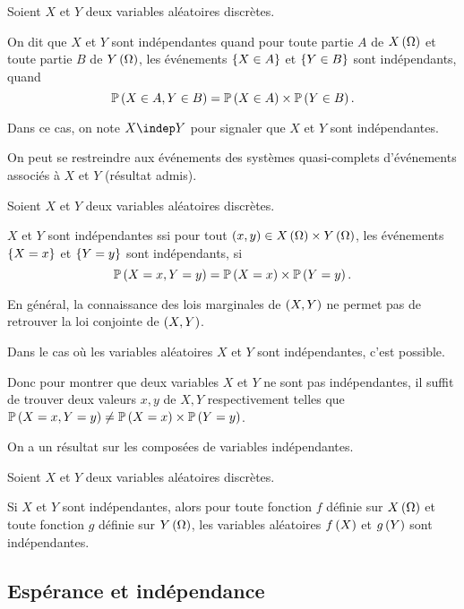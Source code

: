 \begin{defi}
Soient \(X\) et \(Y\) deux variables aléatoires discrètes.

On dit que \(X\) et \(Y\) sont indépendantes quand pour toute partie \(A\) de \(X\left(\Omega\right)\) et toute partie \(B\) de \(Y\left(\Omega\right)\), les événements \(\left\lbrace X\in A\right\rbrace\) et \(\left\lbrace Y\in B\right\rbrace\) sont indépendants, \ie quand \[\mathbb{P}\left(X\in A,Y\in B\right)=\mathbb{P}\left(X\in A\right)\times\mathbb{P}\left(Y\in B\right).\]
\end{defi}

Dans ce cas, on note \(X\indep Y\) pour signaler que \(X\) et \(Y\) sont indépendantes.

On peut se restreindre aux événements des systèmes quasi-complets d'événements associés à \(X\) et \(Y\) (résultat admis).

\begin{prop}
Soient \(X\) et \(Y\) deux variables aléatoires discrètes.

\(X\) et \(Y\) sont indépendantes ssi pour tout \(\left(x,y\right)\in X\left(\Omega\right)\times Y\left(\Omega\right)\), les événements \(\left\lbrace X=x\right\rbrace\) et \(\left\lbrace Y=y\right\rbrace\) sont indépendants, \ie si \[\mathbb{P}\left(X=x,Y=y\right)=\mathbb{P}\left(X=x\right)\times\mathbb{P}\left(Y=y\right).\]
\end{prop}

\begin{rem}
En général, la connaissance des lois marginales de \(\left(X,Y\right)\) ne permet pas de retrouver la loi conjointe de \(\left(X,Y\right)\).

Dans le cas où les variables aléatoires \(X\) et \(Y\) sont indépendantes, c'est possible.

Donc pour montrer que deux variables \(X\) et \(Y\) ne sont pas indépendantes, il suffit de trouver deux valeurs \(x,y\) de \(X,Y\) respectivement telles que \(\mathbb{P}\left(X=x,Y=y\right)\not=\mathbb{P}\left(X=x\right)\times\mathbb{P}\left(Y=y\right)\).
\end{rem}

On a un résultat sur les composées de variables indépendantes.

\begin{prop}
Soient \(X\) et \(Y\) deux variables aléatoires discrètes.

Si \(X\) et \(Y\) sont indépendantes, alors pour toute fonction \(f\) définie sur \(X\left(\Omega\right)\) et toute fonction \(g\) définie sur \(Y\left(\Omega\right)\), les variables aléatoires \(f\left(X\right)\) et \(g\left(Y\right)\) sont indépendantes.
\end{prop}

\subsection{Espérance et indépendance}

